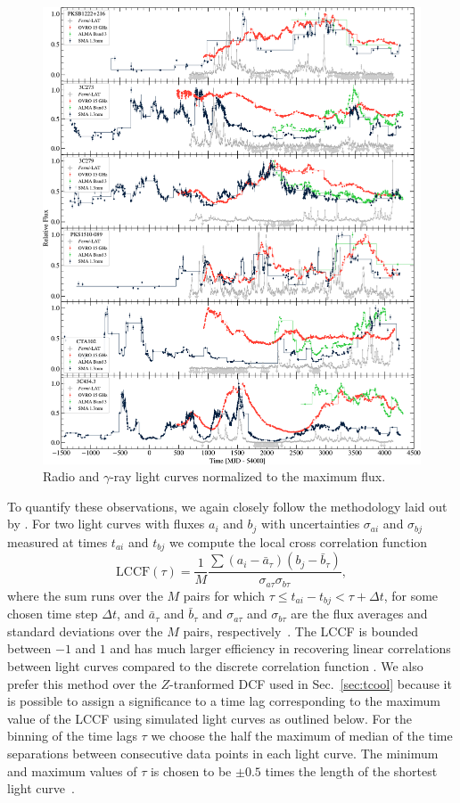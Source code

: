 \documentclass[twocolumn,linenumbers]{aastex62}
\newcommand{\gray}{$\gamma$-ray\xspace}
\begin{document}
\begin{figure}
    \centering
    \includegraphics[width = .9\linewidth]{figures/lc_gamma_radio_tsmin9.pdf}
    \caption{Radio and \gray light curves normalized to the maximum flux.}
    \label{fig:lc-radio}
\end{figure}

To quantify these observations, we again closely follow the methodology laid out by \citet{2014MNRAS.445..437M}. 
For two light curves with fluxes $a_i$ and $b_j$ with uncertainties $\sigma_{ai}$ and $\sigma_{bj}$ measured at times $t_{ai}$ and $t_{bj}$ we compute the local cross correlation function
\begin{equation}
\mathrm{LCCF}(\tau) = \frac{1}{M}\frac{\sum(a_i - \bar{a}_\tau)(b_j - \bar{b}_\tau)}{\sigma_{a\tau}\sigma_{b\tau}},
\end{equation}
where the sum runs over the $M$ pairs for which $\tau \leqslant t_{ai} - t_{bj} < \tau + \Delta t$, for some chosen time step $\Delta t$, and $\bar{a}_\tau$ and $\bar{b}_\tau$ and $\sigma_{a\tau}$ and $\sigma_{b\tau}$ are the flux averages and standard deviations over the $M$ pairs, respectively~\citep{1999PASP..111.1347W}. 
The LCCF is bounded between $-1$ and $1$ and has much larger efficiency in recovering linear correlations between light curves compared to the discrete correlation function \citep{2014MNRAS.445..437M}.
We also prefer this method over the $Z$-tranformed DCF used in Sec.~\ref{sec:tcool} because it is possible to assign a significance to a time lag corresponding to the maximum value of the LCCF using simulated light curves as outlined below. 
For the binning of the time lags $\tau$ we choose the half the maximum of median of the time separations between consecutive data points in each light curve.
The minimum and maximum values of $\tau$ is chosen to be $\pm0.5$ times the length of the shortest light curve~\citep{2014MNRAS.445..428M}.
\end{document}
